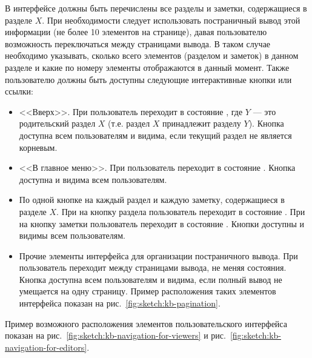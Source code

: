 \begin{enumerate}
                В интерфейсе должны быть перечислены все разделы и заметки, содержащиеся в разделе
                \(X\). При необходимости следует использовать постраничный вывод этой информации
                (не более 10 элементов на странице), давая пользователю возможность переключаться
                между страницами вывода. В таком случае необходимо указывать, сколько всего элементов
                (разделом и заметок) в данном разделе и какие по номеру элементы отображаются в данный момент.
                Также пользователю должны быть доступны следующие интерактивные кнопки или ссылки:
                \begin{itemize}
                    \item
                        <<Вверх>>.
                        При  пользователь переходит в состояние
                        \hyperref[itm:req:ui:states:navx]
                        {}, где \(Y\)
                        --- это родительский раздел \(X\) (т.е. раздел \(X\) принадлежит
                        разделу \(Y\)).
                        Кнопка доступна всем пользователям и видима, если текущий раздел
                        не является корневым.
                    \item
                        <<В главное меню>>.
                        При  пользователь переходит в состояние
                        \hyperref[itm:req:ui:states:mainmenu]
                        {}.
                        Кнопка доступна и видима всем пользователям.
                    \item
                        По одной кнопке на каждый раздел и каждую заметку, содержащиеся в разделе \(X\).
                        При  на кнопку раздела пользователь переходит в состояние
                        \hyperref[itm:req:ui:states:navx]
                        {}.
                        При  на кнопку заметки пользователь переходит в состояние
                        \hyperref[itm:req:ui:states:view-note]
                        {}.
                        Кнопки доступны и видимы всем пользователям.
                    \item
                        Прочие элементы интерфейса для организации постраничного вывода.
                        При  пользователь переходит между страницами
                        вывода, не меняя состояния.
                        Кнопка доступна всем пользователям и видима, если полный
                        вывод не умещается на одну страницу.
                        Пример расположения таких элементов интерфейса показан
                        на рис.~\ref{fig:sketch:kb-pagination}.
                \end{itemize}
                Пример возможного расположения элементов пользовательского интерфейса показан на
                рис.~\ref{fig:sketch:kb-navigation-for-viewers} и
                рис.~\ref{fig:sketch:kb-navigation-for-editors}.


\end{enumerate}
